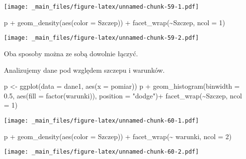 \documentclass[
]{book}
\newenvironment{Shaded}{\begin{snugshade}}{\end{snugshade}}
\newcommand{\AttributeTok}[1]{\textcolor[rgb]{0.77,0.63,0.00}{#1}}
\newcommand{\DecValTok}[1]{\textcolor[rgb]{0.00,0.00,0.81}{#1}}
\newcommand{\FloatTok}[1]{\textcolor[rgb]{0.00,0.00,0.81}{#1}}
\newcommand{\FunctionTok}[1]{\textcolor[rgb]{0.00,0.00,0.00}{#1}}
\newcommand{\NormalTok}[1]{#1}
\newcommand{\OtherTok}[1]{\textcolor[rgb]{0.56,0.35,0.01}{#1}}
\newcommand{\SpecialCharTok}[1]{\textcolor[rgb]{0.00,0.00,0.00}{#1}}
\newcommand{\StringTok}[1]{\textcolor[rgb]{0.31,0.60,0.02}{#1}}
\begin{document}
\texttt{[image: \_main\_files/figure-latex/unnamed-chunk-59-1.pdf]}

\begin{Shaded}
\begin{Highlighting}[]
\NormalTok{p }\SpecialCharTok{+} \FunctionTok{geom\_density}\NormalTok{(}\FunctionTok{aes}\NormalTok{(}\AttributeTok{color =}\NormalTok{ Szczep)) }\SpecialCharTok{+} \FunctionTok{facet\_wrap}\NormalTok{(}\SpecialCharTok{\textasciitilde{}}\NormalTok{Szczep, }\AttributeTok{ncol =} \DecValTok{1}\NormalTok{)}
\end{Highlighting}
\end{Shaded}

\texttt{[image: \_main\_files/figure-latex/unnamed-chunk-59-2.pdf]}

Oba sposoby można ze sobą dowolnie łączyć.

Analizujemy dane pod względem szczepu i warunków.

\begin{Shaded}
\begin{Highlighting}[]
\NormalTok{p }\OtherTok{\textless{}{-}} \FunctionTok{ggplot}\NormalTok{(}\AttributeTok{data =}\NormalTok{ dane1, }\FunctionTok{aes}\NormalTok{(}\AttributeTok{x =}\NormalTok{ pomiar))}
\NormalTok{p }\SpecialCharTok{+} \FunctionTok{geom\_histogram}\NormalTok{(}\AttributeTok{binwidth =} \FloatTok{0.5}\NormalTok{, }\FunctionTok{aes}\NormalTok{(}\AttributeTok{fill =} \FunctionTok{factor}\NormalTok{(warunki)), }\AttributeTok{position =} \StringTok{"dodge"}\NormalTok{)}\SpecialCharTok{+}
  \FunctionTok{facet\_wrap}\NormalTok{(}\SpecialCharTok{\textasciitilde{}}\NormalTok{Szczep, }\AttributeTok{ncol =} \DecValTok{1}\NormalTok{)}
\end{Highlighting}
\end{Shaded}

\texttt{[image: \_main\_files/figure-latex/unnamed-chunk-60-1.pdf]}

\begin{Shaded}
\begin{Highlighting}[]
\NormalTok{p }\SpecialCharTok{+} \FunctionTok{geom\_density}\NormalTok{(}\FunctionTok{aes}\NormalTok{(}\AttributeTok{color =}\NormalTok{ Szczep)) }\SpecialCharTok{+} \FunctionTok{facet\_wrap}\NormalTok{(}\SpecialCharTok{\textasciitilde{}}\NormalTok{ warunki, }\AttributeTok{ncol =} \DecValTok{2}\NormalTok{)}
\end{Highlighting}
\end{Shaded}

\texttt{[image: \_main\_files/figure-latex/unnamed-chunk-60-2.pdf]}
\end{document}

